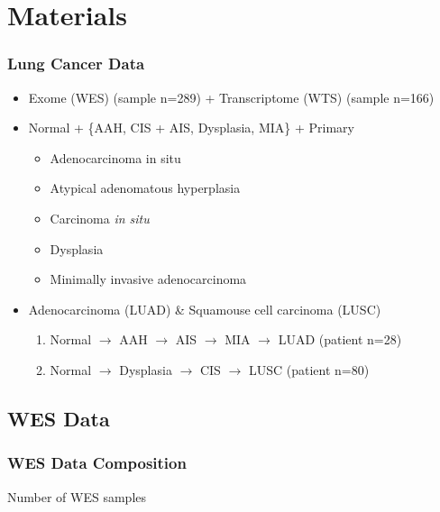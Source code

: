 \documentclass{beamer}
\begin{document}
    \section{Materials}
    \begin{frame}
        \frametitle{Lung Cancer Data}

        \begin{itemize}
            \item Exome (WES) (sample n=289) + Transcriptome (WTS) (sample n=166)
            \item Normal + \{AAH, CIS + AIS, Dysplasia, MIA\} + Primary
            \begin{itemize}
                \item Adenocarcinoma in situ
                \item Atypical adenomatous hyperplasia
                \item Carcinoma \textit{in situ}
                \item Dysplasia
                \item Minimally invasive adenocarcinoma
            \end{itemize}
            \item Adenocarcinoma (LUAD) \& Squamouse cell carcinoma (LUSC)
            \begin{enumerate}
                \item Normal $\rightarrow$ AAH $\rightarrow$ AIS $\rightarrow$ MIA $\rightarrow$ LUAD (patient n=28)
                \item Normal $\rightarrow$ Dysplasia $\rightarrow$ CIS $\rightarrow$ LUSC (patient n=80)
            \end{enumerate}
        \end{itemize}
    \end{frame}

    \subsection{WES Data}
    \begin{frame}
        \frametitle{WES Data Composition}

        \begin{table}
            \caption{Number of WES samples}
            \resizebox{!}{0.3 \textheight}
            {}
        \end{table}
    \end{frame}
\end{document}
